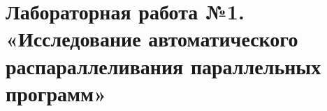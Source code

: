 { %
	\section{Лабораторная работа №1. «Исследование автоматического распараллеливания параллельных программ»}
	
	
	
	
}
